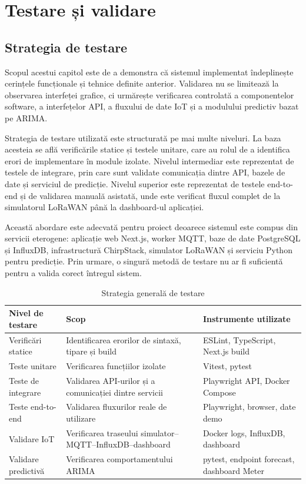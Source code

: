 \chapter{Testare și validare}
\pagestyle{fancy}

\section{Strategia de testare}

Scopul acestui capitol este de a demonstra că sistemul implementat îndeplinește cerințele funcționale și tehnice definite anterior. Validarea nu se limitează la observarea interfeței grafice, ci urmărește verificarea controlată a componentelor software, a interfețelor API, a fluxului de date IoT și a modulului predictiv bazat pe ARIMA.

Strategia de testare utilizată este structurată pe mai multe niveluri. La baza acesteia se află verificările statice și testele unitare, care au rolul de a identifica erori de implementare în module izolate. Nivelul intermediar este reprezentat de testele de integrare, prin care sunt validate comunicația dintre API, bazele de date și serviciul de predicție. Nivelul superior este reprezentat de testele end-to-end și de validarea manuală asistată, unde este verificat fluxul complet de la simulatorul LoRaWAN până la dashboard-ul aplicației.

Această abordare este adecvată pentru proiect deoarece sistemul este compus din servicii eterogene: aplicație web Next.js, worker MQTT, baze de date PostgreSQL și InfluxDB, infrastructură ChirpStack, simulator LoRaWAN și serviciu Python pentru predicție. Prin urmare, o singură metodă de testare nu ar fi suficientă pentru a valida corect întregul sistem.

\begin{table}[htbp]
\centering
\small
\begin{tabular}{|p{}|p{}|p{}|}
\hline
\textbf{Nivel de testare} & \textbf{Scop} & \textbf{Instrumente utilizate} \\
\hline
Verificări statice & Identificarea erorilor de sintaxă, tipare și build & ESLint, TypeScript, Next.js build \\
\hline
Teste unitare & Verificarea funcțiilor izolate & Vitest, pytest \\
\hline
Teste de integrare & Validarea API-urilor și a comunicației dintre servicii & Playwright API, Docker Compose \\
\hline
Teste end-to-end & Validarea fluxurilor reale de utilizare & Playwright, browser, date demo \\
\hline
Validare IoT & Verificarea traseului simulator--MQTT--InfluxDB--dashboard & Docker logs, InfluxDB, dashboard \\
\hline
Validare predictivă & Verificarea comportamentului ARIMA & pytest, endpoint forecast, dashboard Meter \\
\hline
\end{tabular}
\caption{Strategia generală de testare}
\label{tab:strategie-testare}
\end{table}

